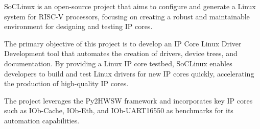 %

SoCLinux is an open-source project that aims to configure and generate a Linux system for RISC-V processors, focusing on creating a robust and maintainable environment for designing and testing IP cores.

The primary objective of this project is to develop an IP Core Linux Driver Development tool that automates the creation of drivers, device trees, and documentation. By providing a Linux IP core testbed, SoCLinux enables developers to build and test Linux drivers for new IP cores quickly, accelerating the production of high-quality IP cores.

The project leverages the Py2HWSW framework and incorporates key IP cores such as IOb-Cache, IOb-Eth, and IOb-UART16550 as benchmarks for its automation capabilities.
